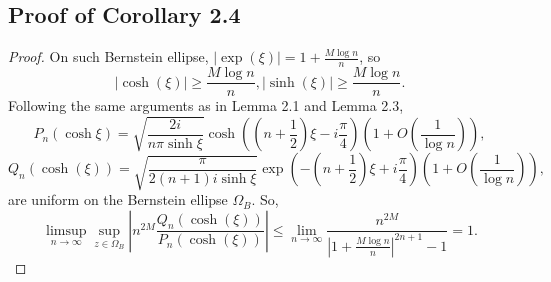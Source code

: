\documentclass[11pt]{article}
\begin{document}
\subsection{Proof of Corollary 2.4}
\begin{proof} 
On such Bernstein ellipse, $|\exp(\xi)| = 1 + \frac{M \log n}{n}$, so
    \begin{equation}
        |\cosh(\xi)| \geq \frac{M\log n}{n}, |\sinh(\xi)| \geq \frac{M\log n}{n}.
    \end{equation}
Following the same arguments as in Lemma 2.1 and Lemma 2.3, 
\begin{equation}
    P_n(\cosh \xi) = \sqrt{\frac{2i}{n\pi \sinh \xi}}\cosh\left((n+\frac{1}{2})\xi-i\frac{\pi}{4}\right) \left( 1 + O(\frac{1}{\log n}) \right),
\end{equation}
\begin{equation}
    Q_n(\cosh(\xi)) = \sqrt{\frac{\pi}{2(n+1)i \sinh \xi}}\exp\left(-(n+\frac{1}{2})\xi+i\frac{\pi}{4}\right)  \left( 1 + O(\frac{1}{\log n}) \right),
\end{equation}
are uniform on the Bernstein ellipse $\Omega_B$. So,
\begin{equation}
        \limsup_{n \to \infty} \sup_{z \in \Omega_B} \left| n^{2M}\frac{Q_n(\cosh(\xi))}{P_n(\cosh(\xi))} \right| \leq \lim_{n \to \infty} \frac{n^{2M}}{|1 +\frac{M \log n}{n}|^{2n+1}-1} = 1.
    \end{equation}
\end{proof}
\end{document}
